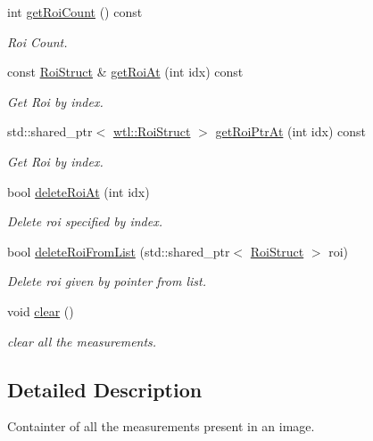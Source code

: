 \begin{DoxyCompactItemize}
int \hyperlink{classwtl_1_1_measurements_a5f5e6c3dfecd34dbb6aad44f64abf2af}{get\+Roi\+Count} () const
\begin{DoxyCompactList}\small\item\em Roi Count. \end{DoxyCompactList}\item 
const \hyperlink{structwtl_1_1_roi_struct}{Roi\+Struct} \& \hyperlink{classwtl_1_1_measurements_a7120cb85575385e966f0a3af99814a47}{get\+Roi\+At} (int idx) const
\begin{DoxyCompactList}\small\item\em Get Roi by index. \end{DoxyCompactList}\item 
std\+::shared\+\_\+ptr$<$ \hyperlink{structwtl_1_1_roi_struct}{wtl\+::\+Roi\+Struct} $>$ \hyperlink{classwtl_1_1_measurements_ae12d47e8833b6d390d35473ade7be332}{get\+Roi\+Ptr\+At} (int idx) const
\begin{DoxyCompactList}\small\item\em Get Roi by index. \end{DoxyCompactList}\item 
bool \hyperlink{classwtl_1_1_measurements_a7f2320fef6dc9959686054a4bea6f77e}{delete\+Roi\+At} (int idx)
\begin{DoxyCompactList}\small\item\em Delete roi specified by index. \end{DoxyCompactList}\item 
bool \hyperlink{classwtl_1_1_measurements_a7fc7bb55f5b62b18736edd1470660b5e}{delete\+Roi\+From\+List} (std\+::shared\+\_\+ptr$<$ \hyperlink{structwtl_1_1_roi_struct}{Roi\+Struct} $>$ roi)
\begin{DoxyCompactList}\small\item\em Delete roi given by pointer from list. \end{DoxyCompactList}\item 
void \hyperlink{classwtl_1_1_measurements_abc23cb0e4c6b6dbae6637dad635171f9}{clear} ()
\begin{DoxyCompactList}\small\item\em clear all the measurements. \end{DoxyCompactList}\end{DoxyCompactItemize}


\subsection{Detailed Description}
Containter of all the measurements present in an image. 

